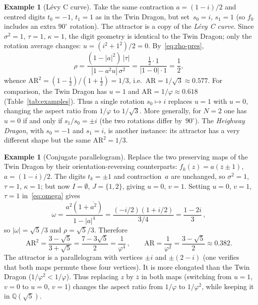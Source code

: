 \documentclass{amsart}
\theoremstyle{definition}
\newtheorem{example}[theorem]{Example}
\theoremstyle{remark}
\begin{document}
\begin{example}[L\'evy C curve]\label{ex:levy}
Take the same contraction $a = (1-i)/2$ and centred digits
$t_0 = -1$, $t_1 = 1$ as in the Twin Dragon,
but set~$s_0 = i$, $s_1 = 1$
(so $f_0$ includes an extra $90^\circ$ rotation).
The attractor is a copy of the \emph{L\'evy C curve}.
Since $\sigma^2 = 1$, $\tau = 1$, $\kappa = 1$,
the digit geometry is identical to the Twin Dragon;
only the rotation average changes:
$u = (i^2 + 1^2)/2 = 0$.
By~\eqref{eq:rho-pres},
\[
  \rho
  = \frac{(1-|a|^2)\,|\tau|}{|1-a^2 u|\,\sigma^2}
  = \frac{\tfrac{1}{2}\cdot 1}{|1-0|\cdot 1}
  = \frac{1}{2},
\]
whence $\mathrm{AR}^2 = (1-\tfrac{1}{2})/(1+\tfrac{1}{2}) = 1/3$,
i.e.\ $\mathrm{AR} = 1/\sqrt{3} \approx 0.577$.
For comparison, the Twin Dragon has $u=1$ and
$\mathrm{AR} = 1/\varphi \approx 0.618$
(Table~\ref{tab:examples}).
Thus a single rotation $s_0 \mapsto i$ replaces $u=1$ with $u=0$,
changing the aspect ratio from $1/\varphi$ to $1/\sqrt{3}$.
More generally, for $N=2$ one has $u = 0$ if and only if
$s_1/s_0 = \pm i$
(the two rotations differ by~$90^\circ$).
The \emph{Heighway Dragon}, with $s_0 = -1$ and $s_1 = i$,
is another instance: its attractor has a very different shape
but the same $\mathrm{AR}^2 = 1/3$.
\end{example}

\begin{example}[Conjugate parallelogram]\label{ex:refl}
Replace the two preserving maps of the Twin Dragon
by their orientation-reversing counterparts:
$f_k(z) = a(\overline{z} \pm 1)$, $a = (1-i)/2$.
The digits $t_k = \pm 1$ and contraction~$a$ are unchanged,
so $\sigma^2 = 1$, $\tau = 1$, $\kappa = 1$;
but now $I = \emptyset$, $J = \{1,2\}$, giving
$u = 0$, $v = 1$.
Setting $u=0$, $v=1$, $\tau=1$ in~\eqref{eq:omega} gives
\[
  \omega
  = \frac{a^2(1+\overline{a^2})}{1-|a|^4}
  = \frac{(-i/2)(1+i/2)}{3/4}
  = \frac{1-2i}{3}\,,
\]
so $|\omega| = \sqrt{5}/3$ and $\rho = \sqrt{5}/3$.
Therefore
\[
  \mathrm{AR}^2
  = \frac{3-\sqrt{5}}{3+\sqrt{5}}
  = \frac{7-3\sqrt{5}}{2}
  = \frac{1}{\varphi^4}\,,
  \qquad
  \mathrm{AR} = \frac{1}{\varphi^2} = \frac{3-\sqrt{5}}{2} \approx 0.382.
\]
The attractor is a parallelogram
with vertices $\pm i$ and $\pm(2-i)$
(one verifies that both maps permute these four vertices).
It is more elongated than the Twin Dragon ($1/\varphi^2 < 1/\varphi$).
Thus replacing $z$ by $\overline{z}$ in both maps
(switching from $u=1$, $v=0$ to $u=0$, $v=1$)
changes the aspect ratio from $1/\varphi$ to $1/\varphi^2$,
while keeping it in $\mathbb{Q}(\sqrt{5})$.
\end{example}
\end{document}
